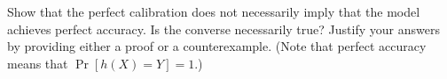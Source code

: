 \item {}
Show that
the perfect calibration does not necessarily imply that the model achieves perfect accuracy. Is the
converse necessarily true? Justify your answers by providing either a proof or a counterexample. (Note that perfect accuracy means that $\Pr[h(X) = Y] = 1$.)

